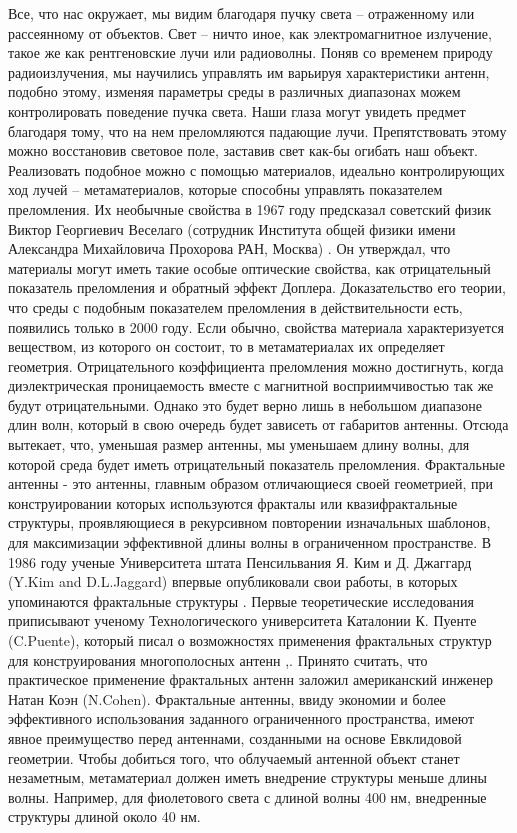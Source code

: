 Все, что нас окружает, мы видим благодаря пучку света – отраженному или рассеянному от объектов. Свет – ничто иное, как электромагнитное излучение, такое же как рентгеновские лучи или радиоволны. Поняв со временем природу радиоизлучения, мы научились управлять им варьируя характеристики антенн, подобно этому, изменяя параметры среды в различных диапазонах можем контролировать поведение пучка света.
Наши глаза могут увидеть предмет благодаря тому, что на нем преломляются падающие лучи. Препятствовать этому можно восстановив световое поле, заставив свет как-бы огибать наш объект. Реализовать подобное можно с помощью материалов, идеально контролирующих ход лучей – метаматериалов, которые способны управлять показателем преломления. 
Их необычные свойства в 1967 году предсказал советский физик Виктор Георгиевич Веселаго (сотрудник Института общей физики имени Александра Михайловича Прохорова РАН, Москва) \cite{b11}. Он утверждал, что материалы могут иметь такие особые оптические свойства, как отрицательный показатель преломления и обратный эффект Доплера. Доказательство его теории, что среды с подобным показателем преломления в действительности есть, появились только в 2000 году. Если обычно, свойства материала характеризуется веществом, из которого он состоит, то в метаматериалах их определяет геометрия. Отрицательного коэффициента преломления можно достигнуть, когда диэлектрическая проницаемость вместе с магнитной восприимчивостью так же будут отрицательными. Однако это будет верно лишь в небольшом диапазоне длин волн, который в свою очередь будет зависеть от габаритов антенны. Отсюда вытекает, что, уменьшая размер антенны, мы уменьшаем длину волны, для которой среда будет иметь отрицательный показатель преломления.
Фрактальные антенны - это антенны, главным образом отличающиеся своей геометрией, при конструировании которых используются фракталы или квазифрактальные структуры, проявляющиеся в рекурсивном повторении изначальных шаблонов, для максимизации эффективной длины волны в ограниченном пространстве.
В 1986 году ученые Университета штата Пенсильвания Я. Ким и Д. Джаггард (Y.Kim and D.L.Jaggard)  впервые опубликовали свои работы, в которых упоминаются фрактальные структуры \cite{b1}. Первые теоретические исследования приписывают ученому Технологического университета Каталонии К. Пуенте (C.Puente), который писал о возможностях применения фрактальных структур для конструирования многополосных антенн \cite{b8},\cite{b9}. Принято считать, что практическое применение фрактальных антенн заложил американский инженер Натан Коэн (N.Cohen)\cite{b10}. 
Фрактальные антенны, ввиду экономии и более эффективного использования заданного ограниченного пространства, имеют явное преимущество перед антеннами, созданными на основе Евклидовой геометрии. Чтобы добиться того, что облучаемый антенной объект станет незаметным, метаматериал должен иметь внедрение структуры меньше длины волны. Например, для фиолетового света с длиной волны 400 нм, внедренные структуры длиной около 40 нм. 
